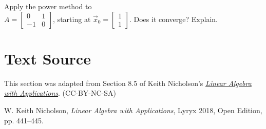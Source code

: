\documentclass{ximera}
\begin{document}
\begin{problem}\label{prob:power_method_trouble}
Apply the power method to \\ $A = \left[ \begin{array}{rr}
0 & 1 \\
-1 & 0
\end{array}\right]$, starting at $\vec{x}_{0} = \left[ \begin{array}{rr}
1 \\
1
\end{array}\right]$. Does it converge? Explain.
\end{problem}


\section*{Text Source} This section was adapted from Section 8.5 of Keith Nicholson's \href{https://open.umn.edu/opentextbooks/textbooks/linear-algebra-with-applications}{\it Linear Algebra with Applications}. (CC-BY-NC-SA)

W. Keith Nicholson, {\it Linear Algebra with Applications}, Lyryx 2018, Open Edition, pp. 441--445.
\end{document}
